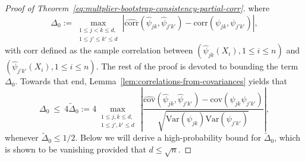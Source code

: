 \documentclass[11pt]{article}
\let\tilde\widetilde
\begin{document}
\begin{appendices}
\begin{proof}[Proof of Theorem~\ref{eq:multplier-bootstrap-consistency-partial-corr}]
where
\[
\Delta_0 := \max_{\substack{1\le j < k\le d,\\1\le j' \le k'\le d}}\left|\widehat{\mbox{corr}}(\widehat{\psi}_{jk}, \widehat{\psi}_{j'k'}) - \mbox{corr}(\psi_{jk}, \psi_{j'k'})\right|,
\]
with $\widehat{\mbox{corr}}$  defined as the sample correlation between $(\widehat{\psi}_{jk}(X_i), 1\le i\le n)$ and $(\widehat{\psi}_{j'k'}(X_i), 1\le i\le n)$. The rest of the proof is devoted to bounding the term $\Delta_0$.
Towards that end, Lemma~\ref{lem:correlations-from-covariances}  yields that
\begin{equation}\label{eq:Delta_zero-Delta_tilde-bound}
\Delta_0 ~\le~ 4\widetilde{\Delta}_0 := 4\max_{\substack{1\le j,k\le d,\\1\le j',k' \le d}}\,\left|\frac{\widehat{\mbox{cov}}(\widehat{\psi}_{jk}, \widehat{\psi}_{j'k'}) - \mbox{cov}(\psi_{jk}\psi_{j'k'})}{\sqrt{\mbox{Var}(\psi_{jk})\mbox{Var}(\psi_{j'k'})}}\right|, 
\end{equation}
whenever $\widetilde{\Delta}_0 \le 1/2$. 
Below we will derive a high-probability bound for $\tilde{\Delta}_0$, which is shown to be vanishing provided that $d \le \sqrt{n}$.


\end{proof}
\end{appendices}
\end{document}
